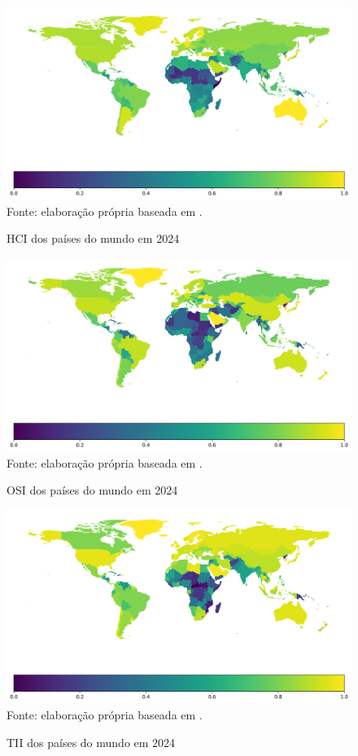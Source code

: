 \begin{figure}[H]
	\centering
	\caption{HCI dos países do mundo em 2024}
	\includegraphics[width=1\linewidth]{figuras/mapa_coropletico_paises_hci}
	\label{fig:mapa_coropletico_paises_hci}
	\footnotesize{Fonte: elaboração própria baseada em \cite{ONU_EGDI_mapa}.}
\end{figure}

\begin{figure}[H]
	\centering
	\caption{OSI dos países do mundo em 2024}
	\includegraphics[width=1\linewidth]{figuras/mapa_coropletico_paises_osi}
	\label{fig:mapa_coropletico_paises_osi}
	\footnotesize{Fonte: elaboração própria baseada em \cite{ONU_EGDI_mapa}.}
\end{figure}

\begin{figure}[H]
	\centering
	\caption{TII dos países do mundo em 2024}
	\includegraphics[width=1\linewidth]{figuras/mapa_coropletico_paises_tii}
	\label{fig:mapa_coropletico_paises_tii}
	\footnotesize{Fonte: elaboração própria baseada em \cite{ONU_EGDI_mapa}.}
\end{figure}

